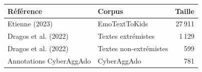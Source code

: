 \begin{tabular}{llr}
\toprule
\textbf{Référence} & \textbf{Corpus} & \textbf{Taille} \\
\midrule
Etienne (2023) & EmoTextToKids & 27\,911 \\
Dragos et al. (2022) & Textes extrémistes & 1\,129 \\
Dragos et al. (2022) & Textes non-extrémistes & 599 \\
Annotations CyberAggAdo & CyberAggAdo & 781 \\
\bottomrule
\end{tabular}
